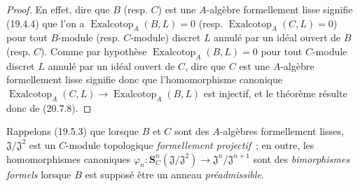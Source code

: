 \begin{proof}
En effet, dire que $B$ (resp. $C$) est une $A$-algèbre formellement lisse
signifie (19.4.4) que l'on a
$\operatorname{Exalcotop}_A(B,L)=0$ (resp.
$\operatorname{Exalcotop}_A(C,L)=0$) pour tout $B$-module (resp. $C$-module)
discret $L$ annulé par un idéal ouvert de $B$ (resp. $C$). Comme par hypothèse
$\operatorname{Exalcotop}_A(B,L)=0$ pour tout $C$-module discret $L$ annulé
par un idéal ouvert de $C$, dire que $C$ est une $A$-algèbre formellement lisse
signifie donc que l'homomorphisme canonique
$\operatorname{Exalcotop}_A(C,L)\longrightarrow
\operatorname{Exalcotop}_A(B,L)$ est injectif, et le théorème résulte donc de
(20.7.8).
\end{proof}

Rappelons (19.5.3) que lorsque $B$ et $C$ sont des $A$-algèbres formellement
lisses, $\mathfrak J/\mathfrak J^2$ est un $C$-module topologique
\emph{formellement projectif}~; en outre, les homomorphismes canoniques
$\varphi_n:\mathbf S_C^n(\mathfrak J/\mathfrak J^2)
\longrightarrow\mathfrak J^n/\mathfrak J^{n+1}$ sont des
\emph{bimorphismes formels} lorsque $B$ est supposé être un anneau
\emph{préadmissible}.
